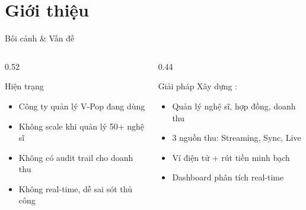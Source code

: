 \section{Giới thiệu}

\begin{frame}{Bối cảnh \& Vấn đề}
    \begin{columns}[T]
        \begin{column}{0.52\textwidth}
            \begin{alertblock}{Hiện trạng}
                \begin{itemize}
                    \item<1-> Công ty quản lý V-Pop đang dùng 
                    \item<2-> Không scale khi quản lý 50+ nghệ sĩ
                    \item<3-> Không có audit trail cho doanh thu
                    \item<4-> Không real-time, dễ sai sót thủ công
                \end{itemize}
            \end{alertblock}
        \end{column}
        \begin{column}{0.44\textwidth}
            \begin{exampleblock}{Giải pháp}
                Xây dựng :
                \begin{itemize}
                    \item Quản lý nghệ sĩ, hợp đồng, doanh thu
                    \item 3 nguồn thu: Streaming, Sync, Live
                    \item Ví điện tử + rút tiền minh bạch
                    \item Dashboard phân tích real-time
                \end{itemize}
            \end{exampleblock}
        \end{column}
    \end{columns}

\end{frame}

